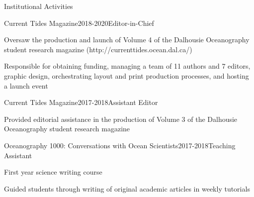 \documentclass{resume} %
\begin{document}
\begin{rSection}{Institutional Activities}
	
	\begin{rSubsection}{Current Tides Magazine}{2018-2020}{Editor-in-Chief}{}
		\item Oversaw the production and launch of Volume 4 of the Dalhousie Oceanography student research magazine (http://currenttides.ocean.dal.ca/)
		\item Responsible for obtaining funding, managing a team of 11 authors and 7 editors, graphic design, orchestrating layout and print production processes, and hosting a launch event
	\end{rSubsection}
	
	\begin{rSubsection}{Current Tides Magazine}{2017-2018}{Assistant Editor}{}
		\item Provided editorial assistance in the production of Volume 3 of the Dalhousie Oceanography student research magazine
	\end{rSubsection}
	
	\begin{rSubsection}{Oceanography 1000: Conversations with Ocean Scientists}{2017-2018}{Teaching Assistant}{}
		\item First year science writing course
		\item Guided students through writing of original academic articles in weekly tutorials
	\end{rSubsection}
	
\end{rSection}


\end{document}
